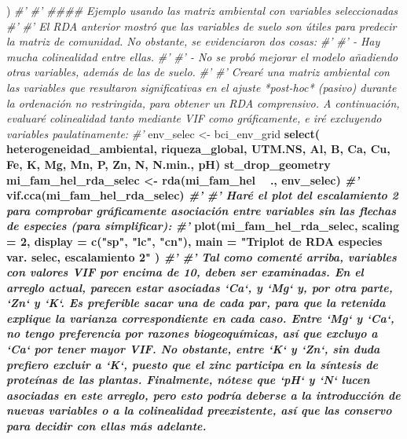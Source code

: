 \documentclass[11pt,]{article}
\newenvironment{Shaded}{\begin{snugshade}}{\end{snugshade}}
\newcommand{\KeywordTok}[1]{\textcolor[rgb]{0.13,0.29,0.53}{\textbf{#1}}}
\newcommand{\DataTypeTok}[1]{\textcolor[rgb]{0.13,0.29,0.53}{#1}}
\newcommand{\DecValTok}[1]{\textcolor[rgb]{0.00,0.00,0.81}{#1}}
\newcommand{\StringTok}[1]{\textcolor[rgb]{0.31,0.60,0.02}{#1}}
\newcommand{\CommentTok}[1]{\textcolor[rgb]{0.56,0.35,0.01}{\textit{#1}}}
\newcommand{\OperatorTok}[1]{\textcolor[rgb]{0.81,0.36,0.00}{\textbf{#1}}}
\newcommand{\NormalTok}[1]{#1}
\begin{document}
\begin{Shaded}
\begin{Highlighting}[]
{{{{{\NormalTok{)}
\CommentTok{#' }
\CommentTok{#' #### Ejemplo usando las matriz ambiental con variables seleccionadas}
\CommentTok{#' }
\CommentTok{#' El RDA anterior mostró que las variables de suelo son útiles para predecir la matriz de comunidad. No obstante, se evidenciaron dos cosas:}
\CommentTok{#' }
\CommentTok{#' - Hay mucha colinealidad entre ellas.}
\CommentTok{#' }
\CommentTok{#' - No se probó mejorar el modelo añadiendo otras variables, además de las de suelo.}
\CommentTok{#' }
\CommentTok{#' Crearé una matriz ambiental con las variables que resultaron significativas en el ajuste *post-hoc* (pasivo) durante la ordenación no restringida, para obtener un RDA comprensivo. A continuación, evaluaré colinealidad tanto mediante VIF como gráficamente, e iré excluyendo variables paulatinamente:}
\CommentTok{#' }
\NormalTok{env_selec <-}\StringTok{ }\NormalTok{bci_env_grid }\OperatorTok{%
\StringTok{  }\KeywordTok{select}\NormalTok{(}
\NormalTok{    heterogeneidad_ambiental,}
\NormalTok{    riqueza_global,}
\NormalTok{    UTM.NS,}
\NormalTok{    Al, B, Ca, Cu, Fe, K, Mg, Mn, P, Zn, N, N.min., pH) }\OperatorTok{%
\StringTok{  }\NormalTok{st_drop_geometry}
\NormalTok{mi_fam_hel_rda_selec <-}\StringTok{ }\KeywordTok{rda}\NormalTok{(mi_fam_hel }\OperatorTok{~}\StringTok{ }\NormalTok{., env_selec)}
\CommentTok{#' }
\KeywordTok{vif.cca}\NormalTok{(mi_fam_hel_rda_selec)}
\CommentTok{#' }
\CommentTok{#' Haré el plot del escalamiento 2 para comprobar gráficamente asociación entre variables sin las flechas de especies (para simplificar):}
\CommentTok{#' }
\KeywordTok{plot}\NormalTok{(mi_fam_hel_rda_selec,}
     \DataTypeTok{scaling =} \DecValTok{2}\NormalTok{,}
     \DataTypeTok{display =} \KeywordTok{c}\NormalTok{(}\StringTok{"sp"}\NormalTok{, }\StringTok{"lc"}\NormalTok{, }\StringTok{"cn"}\NormalTok{),}
     \DataTypeTok{main =} \StringTok{"Triplot de RDA especies ~ var. selec, escalamiento 2"}
\NormalTok{)}
\CommentTok{#' }
\CommentTok{#' Tal como comenté arriba, variables con valores VIF por encima de 10, deben ser examinadas. En el arreglo actual, parecen estar asociadas `Ca`, y `Mg` y, por otra parte, `Zn` y `K`. Es preferible sacar una de cada par, para que la retenida explique la varianza correspondiente en cada caso. Entre `Mg` y `Ca`, no tengo preferencia por razones biogeoquímicas, así que excluyo a `Ca` por tener mayor VIF. No obstante, entre `K` y `Zn`, sin duda prefiero excluir a `K`, puesto que el zinc participa en la síntesis de proteínas de las plantas. Finalmente, nótese que `pH` y `N` lucen asociadas en este arreglo, pero esto podría deberse a la introducción de nuevas variables o a la colinealidad preexistente, así que las conservo para decidir con ellas más adelante.}
}}}}}}}
\end{Highlighting}
\end{Shaded}
\end{document}

